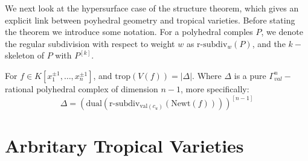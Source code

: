     We next look at the hypersurface case of the structure theorem, which gives an explicit link between poyhedral geometry and tropical varieties.
    Before stating the theorem we introduce some notation. For a polyhedral comples $P$, we denote the regular subdivision with respect to weight $w$ as $\text{r-subdiv}_{w}(P)$, and the $k-$skeleton of $P$ with $P^{[k]}$.
    \begin{theorem}
        For $f \in K[x_1^{\pm 1}, \dots, x_n^{\pm 1}]$, and $\text{trop}(V(f)) = |\Delta|$. Where $\Delta$ is a pure $\Gamma_{val}^n-$rational polyhedral complex of dimension $n-1$, more specifically:
        \begin{equation*}
            \Delta = \left(\text{dual}\left(\text{r-subdiv}_{\text{val}(c_u)}\left(\text{Newt}(f)\right)\right)\right)^{[n-1]}
        \end{equation*}
    \end{theorem}
\section{Arbritary Tropical Varieties}
